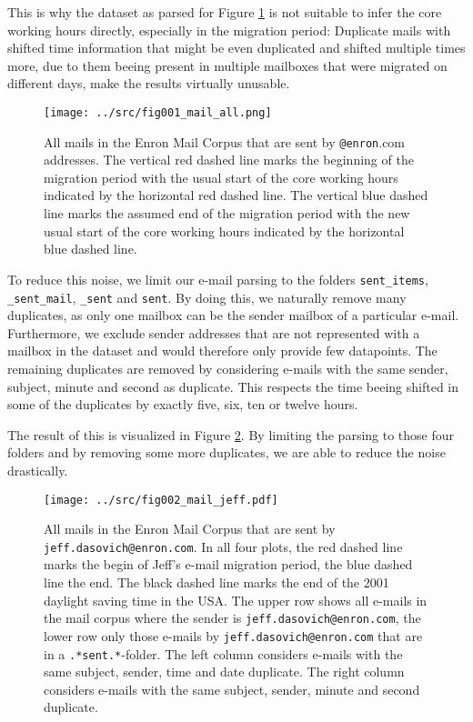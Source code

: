\documentclass{article}
\begin{document}
This is why the dataset as parsed for Figure \ref{fig:allmail} is not suitable
to infer the core working hours directly, especially in the migration period:
Duplicate mails with shifted time information that might be even duplicated and
shifted multiple times more, due to them beeing present in multiple mailboxes
that were migrated on different days, make the results virtually unusable.

\begin{figure}
  \centering
  \texttt{[image: ../src/fig001\_mail\_all.png]}
   \caption{All mails in the Enron Mail Corpus that are sent by
  \texttt{@enron}.com addresses. The vertical red dashed line marks the beginning of
  the migration period with the usual start of the core working hours indicated
  by the horizontal red dashed line. The vertical blue dashed line marks the
  assumed end of the migration period with the new usual start of the core
  working hours indicated by the horizontal blue dashed line.}
  \label{fig:allmail}
\end{figure}

To reduce this noise, we limit our e-mail parsing to the folders
\texttt{sent\_items}, \texttt{\_sent\_mail}, \texttt{\_sent} and \texttt{sent}.
By doing this, we naturally remove many duplicates, as only one mailbox can be
the sender mailbox of a particular e-mail. Furthermore, we exclude sender
addresses that are not represented with a mailbox in the dataset and would
therefore only provide few datapoints. The remaining duplicates are removed by
considering e-mails with the same sender, subject, minute and second as
duplicate. This respects the time beeing shifted in some of the duplicates by
exactly five, six, ten or twelve hours.

The result of this is visualized in Figure \ref{fig:jeffmail}. By limiting the
parsing to those four folders and by removing some more duplicates, we are able
to reduce the noise drastically.

\begin{figure}
  \centering
  \texttt{[image: ../src/fig002\_mail\_jeff.pdf]}
  \label{fig:jeffmail}
  \caption{All mails in the Enron Mail Corpus that are sent by
  \texttt{jeff.dasovich@enron.com}. In all four plots, the red dashed line marks
  the begin of Jeff's e-mail migration period, the blue dashed line the end. The
  black dashed line marks the end of the 2001 daylight saving time in the USA.
  The upper row shows all e-mails in the mail corpus where the sender is
  \texttt{jeff.dasovich@enron.com}, the lower row only those e-mails by
  \texttt{jeff.dasovich@enron.com} that are in a \texttt{.*sent.*}-folder. The
  left column considers e-mails with the same subject, sender, time and date
  duplicate. The right column considers e-mails with the same subject, sender,
  minute and second duplicate.}
\end{figure}
\end{document}
